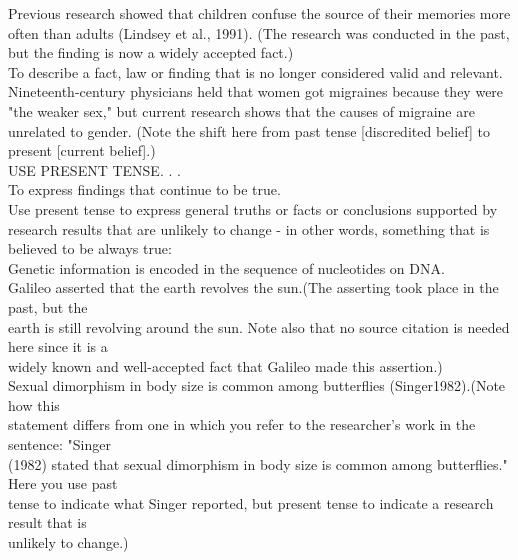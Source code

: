 Previous research showed that children confuse the source of their memories more often than adults (Lindsey et al., 1991). (The research was conducted in the past, but the finding is now a widely accepted fact.)\\

To describe a fact, law or finding that is no longer considered valid and relevant.\\

Nineteenth-century physicians held that women got migraines because they were "the weaker sex," but current research shows that the causes of migraine are unrelated to gender. (Note the shift here from past tense [discredited belief] to present [current belief].)\\

USE PRESENT TENSE. . .\\

To express findings that continue to be true.\\

Use present tense to express general truths or facts or conclusions supported by research results that are unlikely to change - in other words, something that is believed to be always true:\\

       Genetic information is encoded in the sequence of nucleotides on DNA.\\

       Galileo asserted that the earth revolves the sun.(The asserting took place in the past, but the\\
       earth is still revolving around the sun. Note also that no source citation is needed here since it is a\\
       widely known and well-accepted fact that Galileo made this assertion.)\\

       Sexual dimorphism in body size is common among butterflies  (Singer1982).(Note how this\\
       statement differs from one in which you refer to the researcher's work in the sentence: "Singer\\
       (1982) stated that sexual dimorphism in body size is common among butterflies." Here you use past\\
       tense to indicate what Singer reported, but present tense to indicate a research result that is\\
       unlikely to change.)\\

